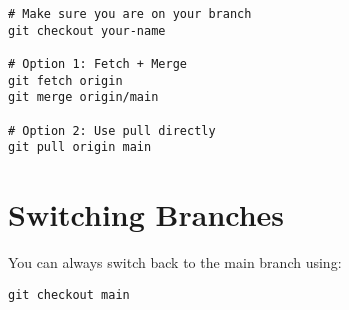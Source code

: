 \documentclass[11pt]{article}
\begin{document}
\begin{lstlisting}
# Make sure you are on your branch
git checkout your-name

# Option 1: Fetch + Merge
git fetch origin
git merge origin/main

# Option 2: Use pull directly
git pull origin main
\end{lstlisting}

\section{Switching Branches}
You can always switch back to the main branch using:

\begin{lstlisting}
git checkout main
\end{lstlisting}
\end{document}
